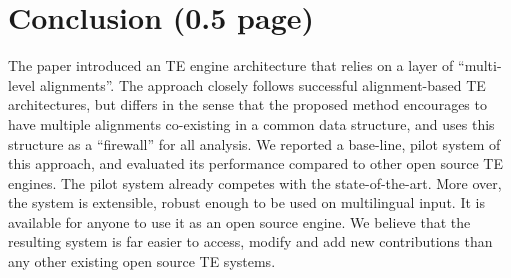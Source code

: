 \documentclass[11pt,letterpaper]{article}
\begin{document}
\section{Conclusion (0.5 page)}

The paper introduced an TE engine architecture that relies on a layer
of ``multi-level alignments''. The approach closely follows successful
alignment-based TE architectures, but differs in the sense that the
proposed method encourages to have multiple alignments co-existing in
a common data structure, and uses this structure as a ``firewall'' for 
all analysis. We reported a base-line, pilot system of this approach,
and evaluated its performance compared to other open source TE
engines. The pilot system already competes with the state-of-the-art. 
More over, the system is extensible, robust enough to be used on
multilingual input. It is available for anyone to use it as an open
source engine. We believe that the resulting system is far easier to
access, modify and add new contributions than any other existing open
source TE systems. 




\end{document}
